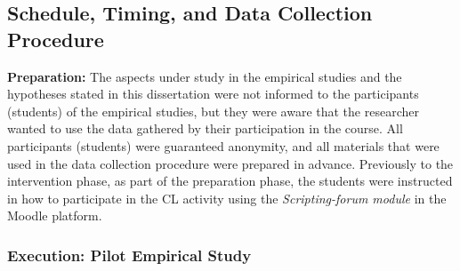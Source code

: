 
\subsection{Schedule, Timing, and Data Collection Procedure}
\label{subsec:data-collection-procedure}

\textbf{Preparation:} The aspects under study in the empirical studies and the hypotheses stated in this dissertation were not informed to the participants (students) of the empirical studies, but they were aware that the researcher wanted to use the data gathered by their participation in the course. All participants (students) were guaranteed anonymity, and all materials that were used in the data collection procedure were prepared in advance. Previously to the intervention phase, as part of the preparation phase, the students were instructed in how to participate in the CL activity using the \emph{Scripting-forum module} in the Moodle platform.

\subsubsection{Execution: Pilot Empirical Study}

